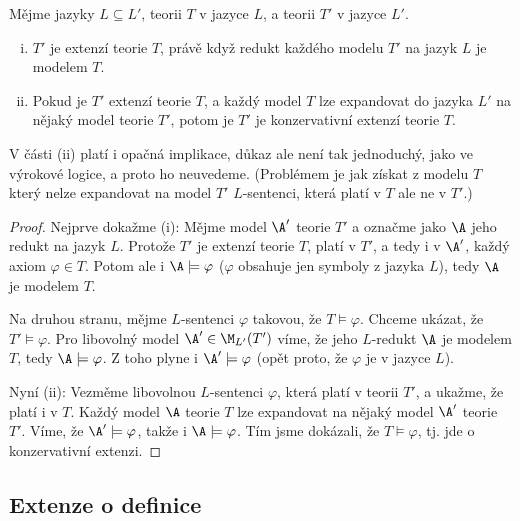 \begin{proposition}\label{proposition:semantic-conditions-for-extensions}
    Mějme jazyky $L\subseteq L'$, teorii $T$ v jazyce $L$, a teorii $T'$ v jazyce $L'$.
    \begin{enumerate}[(i)]
        \item $T'$ je extenzí teorie $T$, právě když redukt každého modelu $T'$ na jazyk $L$ je modelem $T$.
        \item Pokud je $T'$ extenzí teorie $T$, a každý model $T$ lze expandovat do jazyka $L'$ na nějaký model teorie $T'$, potom je $T'$ je konzervativní extenzí teorie $T$.
    \end{enumerate}
\end{proposition}
\begin{remark}
    V části (ii) platí i opačná implikace, důkaz ale není tak jednoduchý, jako ve výrokové logice, a proto ho neuvedeme. (Problémem je jak získat z modelu $T$ který nelze expandovat na model $T'$ $L$-sentenci, která platí v $T$ ale ne v $T'$.)
\end{remark} 
\begin{proof}
    Nejprve dokažme (i): Mějme model $\A'$ teorie $T'$ a označme jako $\A$ jeho redukt na jazyk $L$. Protože $T'$ je extenzí teorie $T$, platí v $T'$, a tedy i v $\A'$, každý axiom $\varphi\in T$. Potom ale i $\A\models\varphi$ ($\varphi$ obsahuje jen symboly z jazyka $L$), tedy $\A$ je modelem $T$.

    Na druhou stranu, mějme $L$-sentenci $\varphi$ takovou, že $T\models\varphi$. Chceme ukázat, že $T'\models\varphi$. Pro libovolný model $\A'\in\M_{L'}(T')$ víme, že jeho $L$-redukt $\A$ je modelem $T$, tedy $\A\models\varphi$. Z toho plyne i $\A'\models\varphi$ (opět proto, že $\varphi$ je v jazyce $L$).

    Nyní (ii): Vezměme libovolnou $L$-sentenci $\varphi$, která platí v teorii $T'$, a ukažme, že platí i v $T$. Každý model $\A$ teorie $T$ lze expandovat na nějaký model $\A'$ teorie $T'$. Víme, že $\A'\models\varphi$, takže i $\A\models\varphi$. Tím jsme dokázali, že $T\models\varphi$, tj. jde o konzervativní extenzi.
    
\end{proof}


\subsection{Extenze o definice}\label{subsection:extension-by-definition}


